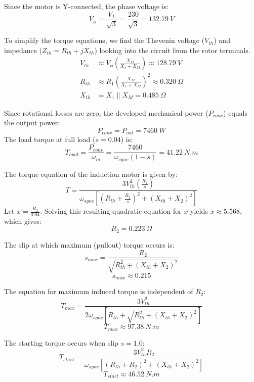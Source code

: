 \documentclass[12pt]{article}
\begin{document}
Since the motor is Y-connected, the phase voltage is:
\begin{equation*}
	V_\phi = \frac{V_L}{\sqrt{3}} = \frac{230}{\sqrt{3}} = \SI{132.79}{V}
\end{equation*}


To simplify the torque equations, we find the Thevenin voltage ($V_{th}$) and impedance ($Z_{th} = R_{th} + jX_{th}$) looking into the circuit from the rotor terminals.
\begin{align*}
	V_{th} &\approx V_\phi \left( \frac{X_M}{X_1 + X_M} \right)\approx \SI{128.79}{V} \\
	R_{th} &\approx R_1 \left( \frac{X_M}{X_1 + X_M} \right)^2 \approx \SI{0.320}{\Omega} \\
	X_{th} &= X_1 \parallel X_M = \SI{0.485}{\Omega}
\end{align*}

Since rotational losses are zero, the developed mechanical power ($P_{conv}$) equals the output power:
\begin{equation*}
	P_{conv} = P_{out} = \SI{7460}{W}
\end{equation*}
The load torque at full load ($s=0.04$) is:
\begin{equation*}
	T_{load} = \frac{P_{conv}}{\omega_m} = \frac{7460}{\omega_{sync}(1-s)} = \SI{41.22}{N.m}
\end{equation*}

The torque equation of the induction motor is given by:
\begin{equation*}
	T = \frac{3 V_{th}^2 \left(\frac{R_2}{s}\right)}{\omega_{sync} \left[ \left(R_{th} + \frac{R_2}{s}\right)^2 + (X_{th} + X_2)^2 \right]}
\end{equation*}
Let $x = \frac{R_2}{0.04}$. Solving this resulting quadratic equation for $x$ yields $x \approx 5.568$, which gives:
\begin{equation*}
	R_2 = \SI{0.223}{\Omega}
\end{equation*}

The slip at which maximum (pullout) torque occurs is:
\begin{equation*}
	s_{max} = \frac{R_2}{\sqrt{R_{th}^2 + (X_{th} + X_2)^2}}
\end{equation*}
\begin{equation*}
	s_{max} \approx 0.215
\end{equation*}

The equation for maximum induced torque is independent of $R_2$:
\begin{equation*}
	T_{max} = \frac{3 V_{th}^2}{2 \omega_{sync} \left[ R_{th} + \sqrt{R_{th}^2 + (X_{th} + X_2)^2} \right]}
\end{equation*}
\begin{equation*}
	T_{max}\approx \SI{97.38}{N.m}
\end{equation*}


The starting torque occurs when slip $s = 1.0$:
\begin{equation*}
	T_{start} = \frac{3 V_{th}^2 R_2}{\omega_{sync} \left[ (R_{th} + R_2)^2 + (X_{th} + X_2)^2 \right]}
\end{equation*}
\begin{equation*}
	T_{start} \approx \SI{46.52}{N.m}
\end{equation*}
\end{document}
